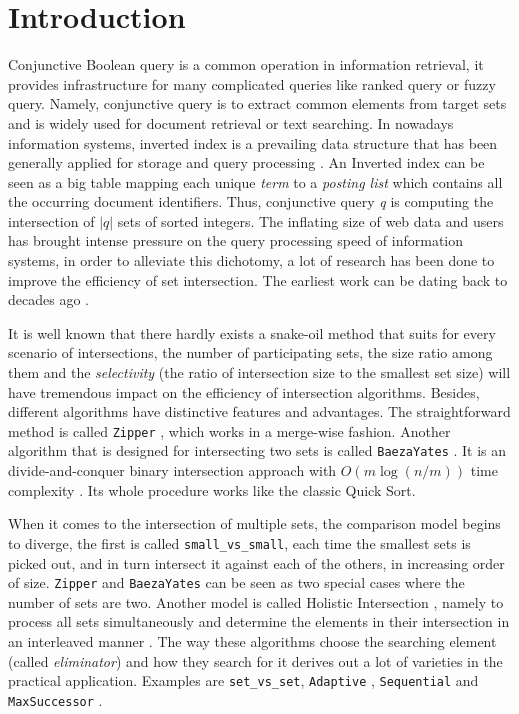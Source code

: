 \documentclass[runningheads,a4paper]{llncs}
\begin{document}
\section{Introduction}\label{sec:introduction}
Conjunctive Boolean query is a common operation in information retrieval, it provides infrastructure for many complicated queries like ranked query or fuzzy query.
Namely, conjunctive query is to extract common elements from target sets and is widely used for document retrieval or text searching.
In nowadays information systems, inverted index is a prevailing data structure that has been generally applied for storage and query processing \cite{culpepper2010efficient,zobel2006inverted}.
An Inverted index can be seen as a big table mapping each unique \textit{term} to a \textit{posting list} which contains all the occurring document identifiers.
Thus, conjunctive query \textit{q} is computing the intersection of $ |q| $ sets of sorted integers.
The inflating size of web data and users has brought intense pressure on the query processing speed of information systems, in order to alleviate this dichotomy, a lot of research has been done to improve the efficiency of set intersection.
The earliest work can be dating back to decades ago \cite{Hwang1971Optimal,Hwang1972A}.

It is well known that there hardly exists a snake-oil method that suits for every scenario of intersections, the number of participating sets, the size ratio among them and the \textit{selectivity} (the ratio of intersection size to the smallest set size) will have tremendous impact on the efficiency of intersection algorithms.
Besides, different algorithms have distinctive features and advantages.
The straightforward method is called \texttt{Zipper} \cite{Sanders2007Intersection}, which works in a merge-wise fashion.
Another algorithm that is designed for intersecting two sets is called \texttt{BaezaYates} \cite{Baeza2010Fast,Baezayates2004A,Baezayates2005Experimental}.
It is an divide-and-conquer binary intersection approach with $ O(m\log (n/m)) $ time complexity \cite{culpepper2010efficient}.
Its whole procedure works like the classic Quick Sort.

When it comes to the intersection of multiple sets, the comparison model begins to diverge, the first is called \texttt{small\_vs\_small}, each time the smallest sets is picked out, and in turn intersect it against each of the others, in increasing order of size.
\texttt{Zipper} and \texttt{BaezaYates} can be seen as two special cases where the number of sets are two.
Another model is called Holistic Intersection \cite{culpepper2010efficient}, namely to process all sets simultaneously and determine the elements in their intersection in an interleaved manner \cite{Culpepper2007Compact}.
The way these algorithms choose the searching element (called \textit{eliminator}) and how they search for it derives out a lot of varieties in the practical application.
Examples are \texttt{set\_vs\_set}, \texttt{Adaptive} \cite{Barbay2006Faster,Demaine2000Adaptive,Demaine2001Experiments}, \texttt{Sequential} \cite{Barbay2002Adaptive,Barbay2003Optimality} and \texttt{MaxSuccessor} \cite{Culpepper2007Compact}.
\end{document}
